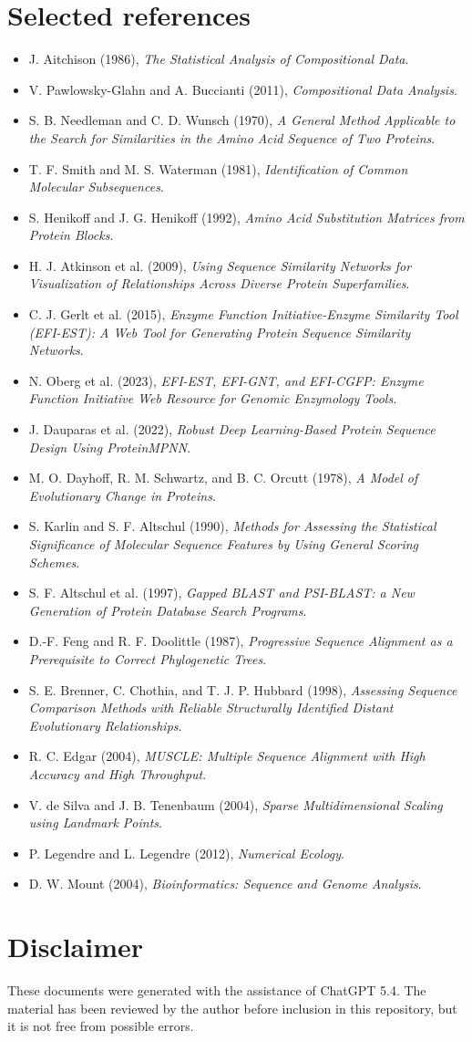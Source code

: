 \documentclass[11pt,a4paper]{article}
\begin{document}
\section{Selected references}

\begin{itemize}[leftmargin=*]
\item J. Aitchison (1986), \emph{The Statistical Analysis of Compositional Data}.
\item V. Pawlowsky-Glahn and A. Buccianti (2011), \emph{Compositional Data Analysis}.
\item S. B. Needleman and C. D. Wunsch (1970), \emph{A General Method Applicable to the Search for Similarities in the Amino Acid Sequence of Two Proteins}.
\item T. F. Smith and M. S. Waterman (1981), \emph{Identification of Common Molecular Subsequences}.
\item S. Henikoff and J. G. Henikoff (1992), \emph{Amino Acid Substitution Matrices from Protein Blocks}.
\item H. J. Atkinson et al. (2009), \emph{Using Sequence Similarity Networks for Visualization of Relationships Across Diverse Protein Superfamilies}.
\item C. J. Gerlt et al. (2015), \emph{Enzyme Function Initiative-Enzyme Similarity Tool (EFI-EST): A Web Tool for Generating Protein Sequence Similarity Networks}.
\item N. Oberg et al. (2023), \emph{EFI-EST, EFI-GNT, and EFI-CGFP: Enzyme Function Initiative Web Resource for Genomic Enzymology Tools}.
\item J. Dauparas et al. (2022), \emph{Robust Deep Learning-Based Protein Sequence Design Using ProteinMPNN}.
\item M. O. Dayhoff, R. M. Schwartz, and B. C. Orcutt (1978), \emph{A Model of Evolutionary Change in Proteins}.
\item S. Karlin and S. F. Altschul (1990), \emph{Methods for Assessing the Statistical Significance of Molecular Sequence Features by Using General Scoring Schemes}.
\item S. F. Altschul et al. (1997), \emph{Gapped BLAST and PSI-BLAST: a New Generation of Protein Database Search Programs}.
\item D.-F. Feng and R. F. Doolittle (1987), \emph{Progressive Sequence Alignment as a Prerequisite to Correct Phylogenetic Trees}.
\item S. E. Brenner, C. Chothia, and T. J. P. Hubbard (1998), \emph{Assessing Sequence Comparison Methods with Reliable Structurally Identified Distant Evolutionary Relationships}.
\item R. C. Edgar (2004), \emph{MUSCLE: Multiple Sequence Alignment with High Accuracy and High Throughput}.
\item V. de Silva and J. B. Tenenbaum (2004), \emph{Sparse Multidimensional Scaling using Landmark Points}.
\item P. Legendre and L. Legendre (2012), \emph{Numerical Ecology}.
\item D. W. Mount (2004), \emph{Bioinformatics: Sequence and Genome Analysis}.
\end{itemize}


\section*{Disclaimer}
These documents were generated with the assistance of ChatGPT 5.4. The material has been reviewed by the author before inclusion in this repository, but it is not free from possible errors.
\end{document}
